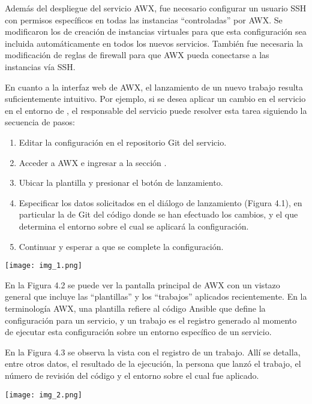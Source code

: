 Además del despliegue del servicio AWX, fue necesario configurar un
usuario SSH con permisos específicos en todas las instancias
``controladas'' por AWX. Se modificaron los  de
creación de instancias virtuales para que esta configuración sea
incluida automáticamente en todos los nuevos servicios. También fue
necesaria la modificación de reglas de firewall para que AWX pueda
conectarse a las instancias vía SSH.

En cuanto a la interfaz web de AWX, el lanzamiento de un nuevo trabajo
resulta suficientemente intuitivo. Por ejemplo, si se desea aplicar un
cambio en el servicio  en el entorno de
, el responsable del servicio puede resolver esta
tarea siguiendo la secuencia de pasos:

\begin{enumerate}
\item Editar la configuración en el repositorio Git del servicio.
\item Acceder a AWX e ingresar a la sección .
\item Ubicar la plantilla  y presionar el
  botón de lanzamiento.
\item Especificar los datos solicitados en el diálogo de lanzamiento
  (Figura 4.1), en particular la  de Git del código donde
  se han efectuado los cambios, y el  que determina el
  entorno sobre el cual se aplicará la configuración.
\item Continuar y esperar a que se complete la configuración.
\end{enumerate}
\texttt{[image: img\_1.png]}



En la Figura 4.2 se puede ver la pantalla principal de AWX con un
vistazo general que incluye las ``plantillas'' y los ``trabajos''
aplicados recientemente. En la terminología AWX, una plantilla refiere
al código Ansible que define la configuración para un servicio, y un
trabajo es el registro generado al momento de ejecutar esta
configuración sobre un entorno específico de un servicio.

En la Figura 4.3 se observa la vista con el registro de un
trabajo. Allí se detalla, entre otros datos, el resultado de la
ejecución, la persona que lanzó el trabajo, el número de revisión del
código y el entorno sobre el cual fue aplicado.

\texttt{[image: img\_2.png]}


